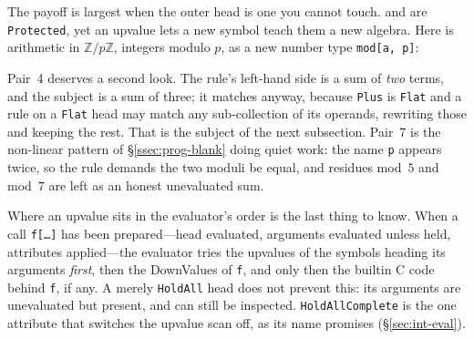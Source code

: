 The payoff is largest when the outer head is one you cannot touch.  and
 are \texttt{Protected}, yet an upvalue lets a new symbol teach them a new
algebra. Here is arithmetic in \(\mathbb{Z}/p\mathbb{Z}\), integers modulo \(p\),
as a new number type \texttt{mod[a, p]}:

\begin{codepairs}
\end{codepairs}

Pair~4 deserves a second look. The rule's left-hand side is a sum of
\emph{two} terms, and the subject is a sum of three; it matches anyway, because
\texttt{Plus} is \texttt{Flat} and a rule on a \texttt{Flat} head may match any
sub-collection of its operands, rewriting those and keeping the rest. That is
the subject of the next subsection. Pair~7 is the non-linear pattern of
\S\ref{ssec:prog-blank} doing quiet work: the name \texttt{p} appears twice, so the
rule demands the two moduli be equal, and residues mod~\(5\) and mod~\(7\) are left
as an honest unevaluated sum.

Where an upvalue sits in the evaluator's order is the last thing to know. When a
call \texttt{f[\ldots]} has been prepared---head evaluated, arguments evaluated
unless held, attributes applied---the evaluator tries the upvalues of the symbols
heading its arguments \emph{first}, then the DownValues of \texttt{f}, and only then
the builtin C code behind \texttt{f}, if any. A
merely \texttt{HoldAll} head does not prevent this: its arguments are unevaluated but
present, and can still be inspected. \texttt{HoldAllComplete} is the one attribute
that switches the upvalue scan off, as its name promises (\S\ref{sec:int-eval}).

